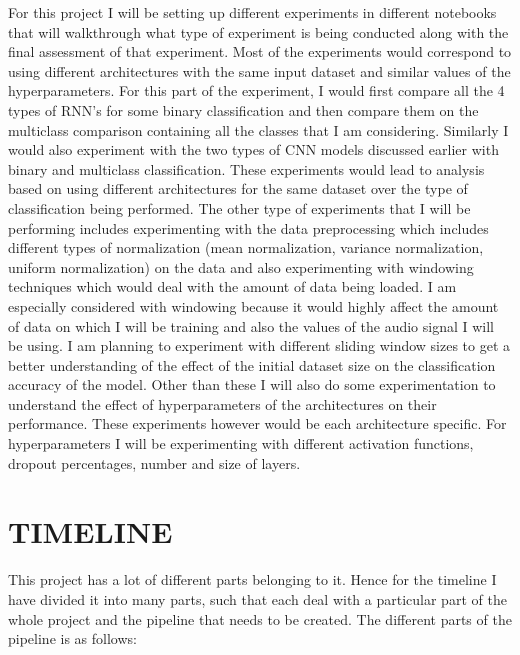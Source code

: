 \documentclass[letterpaper, 12 pt, conference]{ieeeconf}  %
\begin{document}
For this project I will be setting up different experiments in different notebooks that will walkthrough what type of experiment is being conducted along with the final assessment of that experiment. Most of the experiments would correspond to using different architectures with the same input dataset and similar values of the hyperparameters. For this part of the experiment, I would first compare all the 4 types of RNN's for some binary classification and then compare them on the multiclass comparison containing all the classes that I am considering. Similarly I would also experiment with the two types of CNN models discussed earlier with binary and multiclass classification. These experiments would lead to analysis based on using different architectures for the same dataset over the type of classification being performed. The other type of experiments that I will be performing includes experimenting with the data preprocessing which includes different types of normalization (mean normalization, variance normalization, uniform normalization) on the data and also experimenting with windowing techniques which would deal with the amount of data being loaded. I am especially considered with windowing because it would highly affect the amount of data on which I will be training and also the values of the audio signal I will be using. I am planning to experiment with different sliding window sizes to get a better understanding of the effect of the initial dataset size on the classification accuracy of the model. Other than these I will also do some experimentation to understand the effect of hyperparameters of the architectures on their performance. These experiments however would be each architecture specific. For hyperparameters I will be experimenting with different activation functions, dropout percentages, number and size of layers.


\section{TIMELINE}

This project has a lot of different parts belonging to it. Hence for the timeline I have divided it into many parts, such that each deal with a particular part of the whole project and the pipeline that needs to be created. The different parts of the pipeline is as follows:
\end{document}
